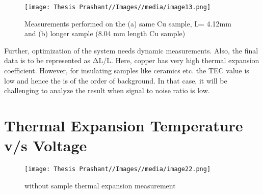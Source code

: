 \begin{figure}
    \centering
    \texttt{[image: Thesis Prashant//Images//media/image13.png]}
    \caption{Measurements performed on the (a) same Cu sample, L= 4.12mm and (b) longer sample (8.04
mm length Cu sample)}
    \label{fig:enter-label}
\end{figure}
Further, optimization of the system needs dynamic measurements. Also, the
final data is to be represented as ΔL/L. Here, copper has very high thermal expansion coefficient. However, for insulating samples like ceramics etc. the TEC value is low and hence the is of the order of background. In that case, it will be challenging to analyze the result when signal to noise ratio is low.

\section{Thermal Expansion Temperature v/s Voltage}

\begin{figure}
    \centering
    \texttt{[image: Thesis Prashant//Images//media/image22.png]}
    \caption{without sample thermal expansion measurement}
    \label{fig:enter-label}
\end{figure}
